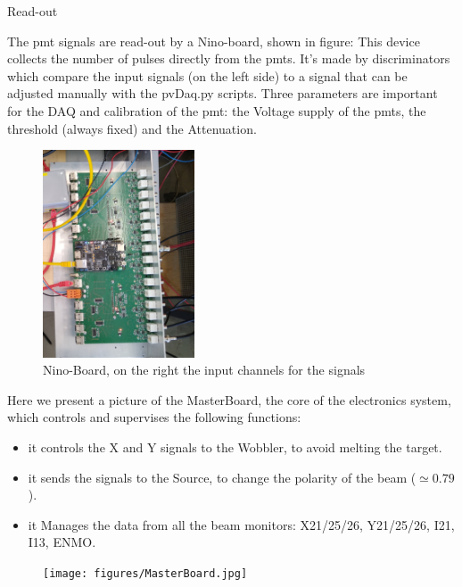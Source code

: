 \documentclass[8pt,a4paper]{beamer}
\begin{document}
\begin{frame}{Read-out}

The pmt signals are read-out by a Nino-board, shown in figure: This device collects the number of pulses directly from the pmts. It’s made by discriminators which compare the input signals (on the left side) to a signal that can be adjusted manually with the pvDaq.py scripts. Three parameters are important for the DAQ and calibration of the pmt: the Voltage supply of the pmts, the threshold (always fixed) and the Attenuation.

\begin{figure}[hbtp]
 
 \centering
 \includegraphics[width = 0.4\textwidth]{figures/NinoBoard.jpg}
 \caption{Nino-Board, on the right the input channels for the signals}
 \end{figure}
  

\end{frame}

\begin{frame}

Here we present a picture of the MasterBoard, the core of the electronics system, which controls and supervises the following functions:

\begin{itemize}
\item it controls the X and Y signals to the Wobbler, to avoid melting the target.
\item it sends the signals to the Source, to change the polarity of the beam ($\simeq 0.79$).
\item it Manages the data from all the beam monitors: X21/25/26, Y21/25/26, I21, I13, ENMO.

\end{itemize}


\begin{figure}
\centering
\texttt{[image: figures/MasterBoard.jpg]}
\end{figure}
 
\end{frame}
\end{document}
